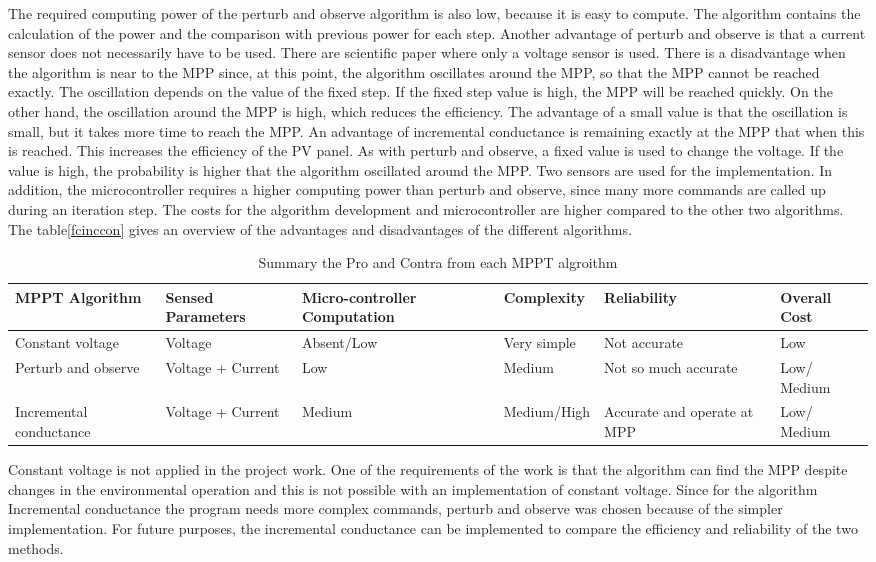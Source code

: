 The required computing power of the perturb and observe algorithm is also low, because it is easy to compute. The algorithm contains the calculation of the power and the comparison with previous power for each step. 
Another advantage of perturb and observe is that a current sensor does not necessarily have to be used. There are scientific paper where only a voltage sensor is used. \cite{} There is a disadvantage when the algorithm is near to the MPP since, at this point, the algorithm oscillates around the MPP, so that the MPP cannot be reached exactly. The oscillation depends on the value of the fixed step. If the fixed step value is high, the MPP will be reached quickly. On the other hand, the oscillation around the MPP is high, which reduces the efficiency. The advantage of a small value is that the oscillation is small, but it takes more time to reach the MPP. \newline
An advantage of incremental conductance is remaining exactly at the MPP that when this is reached. This increases the efficiency of the PV panel. As with perturb and observe, a fixed value is used to change the voltage. If the value is high, the probability is higher that the algorithm oscillated around the MPP. 
Two sensors are used for the implementation. In addition, the microcontroller requires a higher computing power than perturb and observe, since many more commands are called up during an iteration step. The costs for the algorithm development and microcontroller are higher compared to the other two algorithms. \newline
The table\ref{fcinccon} gives an overview of the advantages and disadvantages of the different algorithms.
\begin{table}[H]
	\centering 
		\begin{tabular}{|>{\centering}p{2cm}|>{\centering}p{2cm}|>{\centering}p{2cm}|>{\centering}p{2cm}|>{\centering}p{2cm}|>{\centering}p{2cm}|}
		\hline
		\rowcolor{lightgray}						 \textbf{MPPT Algorithm} & 	
		 \textbf{Sensed Parameters} &
		\textbf{Micro-controller Computation} &
		 \textbf{Complexity}&
		 \textbf{Reliability}	&
		 \textbf{Overall Cost}
		\tabularnewline  \hline
			Constant voltage 	& Voltage 		& Absent/Low &  Very simple & Not accurate & Low 										\tabularnewline \hline
			Perturb and observe & Voltage + Current  & Low  &  Medium & Not so much accurate & Low/ Medium 		\tabularnewline \hline
			Incremental conductance & Voltage + Current & Medium &  Medium/High & Accurate and operate at MPP & Low/ Medium	\tabularnewline	\hline
			\end{tabular}
	\caption{Summary the Pro and Contra from each MPPT algroithm \cite{flowchartVC} }
	\label{tab:summaryMPPT}
\end{table}
Constant voltage is not applied in the project work. One of the requirements of the work is that the algorithm can find the MPP despite changes in the environmental operation and this is not possible with an implementation of constant voltage. Since for the algorithm Incremental conductance the program needs more complex commands, perturb and observe was chosen because of the simpler implementation. For future purposes, the incremental conductance can be implemented to compare the efficiency and reliability of the two methods.


